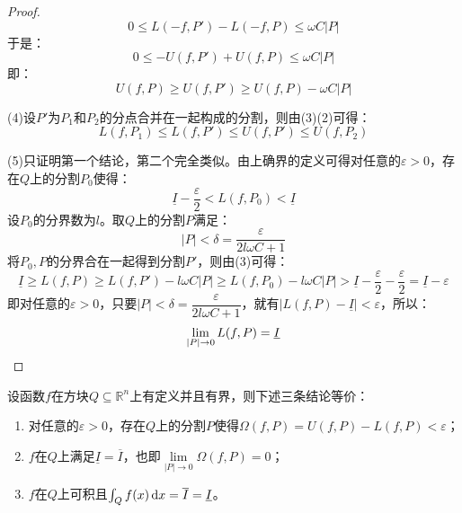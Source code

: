 \begin{proof}
\begin{equation*}
		0\leqslant L(-f,P')-L(-f,P)\leqslant\omega C|P|
	\end{equation*}
	于是：
	\begin{equation*}
		0\leqslant -U(f,P')+U(f,P)\leqslant\omega C|P|
	\end{equation*}
	即：
	\begin{equation*}
		U(f,P)\geqslant U(f,P')\geqslant U(f,P)-\omega C|P|
	\end{equation*}\par
	(4)设$P'$为$P_1$和$P_2$的分点合并在一起构成的分割，则由(3)(2)可得：
	\begin{equation*}
		L(f,P_1)\leqslant L(f,P')\leqslant U(f,P')\leqslant U(f,P_2)
	\end{equation*}\par
	(5)只证明第一个结论，第二个完全类似。由上确界的定义可得对任意的$\varepsilon>0$，存在$Q$上的分割$P_0$使得：
	\begin{equation*}
		\underline{I}-\frac{\varepsilon}{2}<L(f,P_0)<\underline{I}
	\end{equation*}
	设$P_0$的分界数为$l$。取$Q$上的分割$P$满足：
	\begin{equation*}
		|P|<\delta=\frac{\varepsilon}{2l\omega C+1}
	\end{equation*}
	将$P_0,P$的分界合在一起得到分割$P'$，则由(3)可得：
	\begin{equation*}
		\underline{I}\geqslant L(f,P)\geqslant L(f,P')-l\omega C|P|\geqslant L(f,P_0)-l\omega C|P|>\underline{I}-\frac{\varepsilon}{2}-\frac{\varepsilon}{2}=\underline{I}-\varepsilon
	\end{equation*}
	即对任意的$\varepsilon>0$，只要$|P|<\delta=\dfrac{\varepsilon}{2l\omega C+1}$，就有$|L(f,P)-\underline{I}|<\varepsilon$，所以：
	\begin{equation*}
		\lim_{|P|\to0}L(f,P)=\underline{I}\qedhere
	\end{equation*}
\end{proof}
\begin{theorem}\label{theo:RiemannIntegrableIff}
	设函数$f$在方块$Q\subseteq\mathbb{R}^n$上有定义并且有界，则下述三条结论等价：
	\begin{enumerate}
		\item 对任意的$\varepsilon>0$，存在$Q$上的分割$P$使得$\Omega(f,P)=U(f,P)-L(f,P)<\varepsilon$；
		\item $f$在$Q$上满足$\underline{I}=\overline{I}$，也即$\lim\limits_{|P|\to0}\Omega(f,P)=0$；
		\item $f$在$Q$上可积且$\int_{Q}f(x)\mathop{}\!\mathrm{d} x=\overline{I}=\underline{I}$。
	\end{enumerate}
\end{theorem}
